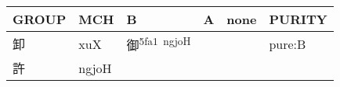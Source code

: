 \documentclass[14pt,a4paper]{scrartcl}
\begin{document}
\begin{longtable}[c]{@{}llllll@{}}
\toprule
\begin{minipage}[b]{0.14\columnwidth}\raggedright\strut
GROUP
\strut\end{minipage} &
\begin{minipage}[b]{0.14\columnwidth}\raggedright\strut
MCH
\strut\end{minipage} &
\begin{minipage}[b]{0.14\columnwidth}\raggedright\strut
B
\strut\end{minipage} &
\begin{minipage}[b]{0.14\columnwidth}\raggedright\strut
A
\strut\end{minipage} &
\begin{minipage}[b]{0.14\columnwidth}\raggedright\strut
none
\strut\end{minipage} &
\begin{minipage}[b]{0.14\columnwidth}\raggedright\strut
PURITY
\strut\end{minipage}\tabularnewline
\midrule
\endhead
\begin{minipage}[t]{0.14\columnwidth}\raggedright\strut
卸
\strut\end{minipage} &
\begin{minipage}[t]{0.14\columnwidth}\raggedright\strut
xuX
\strut\end{minipage} &
\begin{minipage}[t]{0.14\columnwidth}\raggedright\strut
御\textsuperscript{5fa1~ngjoH}
\strut\end{minipage} &
\begin{minipage}[t]{0.14\columnwidth}\raggedright\strut
\strut\end{minipage} &
\begin{minipage}[t]{0.14\columnwidth}\raggedright\strut
\strut\end{minipage} &
\begin{minipage}[t]{0.14\columnwidth}\raggedright\strut
pure:B
\strut\end{minipage}\tabularnewline
\begin{minipage}[t]{0.14\columnwidth}\raggedright\strut
許
\strut\end{minipage} &
\begin{minipage}[t]{0.14\columnwidth}\raggedright\strut
ngjoH
\strut\end{minipage} &
\begin{minipage}[t]{0.14\columnwidth}\raggedright\strut
\strut\end{minipage} &
\begin{minipage}[t]{0.14\columnwidth}\raggedright\strut

\end{minipage}
\end{longtable}
\end{document}
